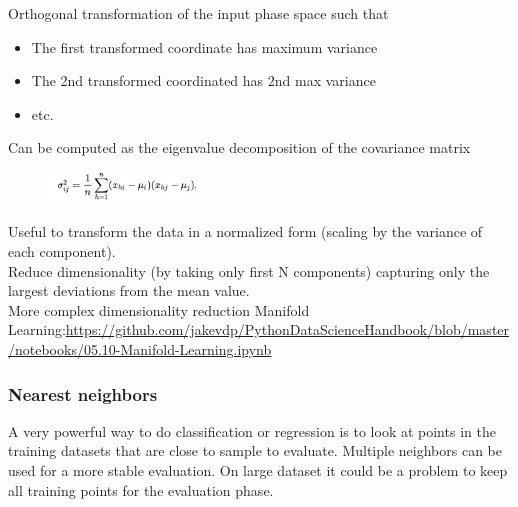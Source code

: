 Orthogonal transformation of the input phase space such that
\begin{itemize}
	\item The first transformed coordinate has maximum variance 
	\item The 2nd transformed coordinated has 2nd max variance
	\item etc.
\end{itemize}

Can be computed as the eigenvalue decomposition of the
covariance matrix

\begin{figure}[ht]
	\includegraphics[width=0.35\textwidth]{figure_ml/pca_covariance.png}
\end{figure}
\FloatBarrier

Useful to transform the data in a normalized form (scaling by the variance of each component).\\
Reduce dimensionality (by taking only first N components) capturing only the largest deviations from the mean value.\\

More complex dimensionality reduction Manifold Learning:\url{https://github.com/jakevdp/PythonDataScienceHandbook/blob/master/notebooks/05.10-Manifold-Learning.ipynb}

\subsubsection{Nearest neighbors}

A very powerful way to do classification or regression is to look at points in the training datasets that are close to sample
to evaluate.
Multiple neighbors can be used for
a more stable evaluation.
On large dataset it could be a problem to keep all training points for the evaluation phase.


